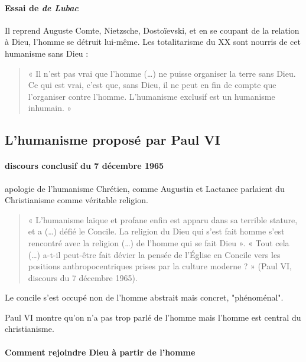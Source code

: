 \paragraph{Essai de \textit{de Lubac}} Il reprend Auguste Comte, Nietzsche, Dostoïevski, et en se coupant de la relation à Dieu, l'homme se détruit lui-même. Les totalitarisme du XX sont nourris de cet humanisme sans Dieu :
\begin{quote}
    « Il n’est pas vrai que l’homme (…) ne puisse organiser la terre sans Dieu. Ce qui est vrai, c’est que, sans Dieu, il ne peut en fin de compte que l’organiser contre l’homme. L’humanisme exclusif est un humanisme inhumain. » 
\end{quote}

\subsection{L’humanisme proposé par Paul VI}

\paragraph{discours conclusif du 7 décembre 1965} apologie de l'humanisme Chrétien, comme Augustin et Lactance parlaient du Christianisme comme véritable religion. 
\begin{quote}
    « L’humanisme laïque et profane enfin est apparu dans sa terrible stature, et a (…) défié le Concile. La religion du Dieu qui s’est fait homme s’est rencontré avec la religion (…) de l’homme qui se fait Dieu ». « Tout cela (…) a-t-il peut-être fait dévier la pensée de l’Église en Concile vers les positions anthropocentriques prises par la culture moderne ? » (Paul VI, discours du 7 décembre 1965). 
\end{quote}
Le concile s'est occupé non de l'homme abstrait mais concret, "phénoménal". 

Paul VI montre qu'on n'a pas trop parlé de l'homme mais l'homme est central du christianisme.

\paragraph{Comment rejoindre Dieu à partir de l'homme}


